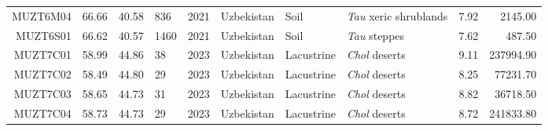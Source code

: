 \begin{table}[ht]
\begin{tabular}{rrrlrlllrr}
  MUZT6M04 & 66.66 & 40.58 & 836 & 2021 & Uzbekistan & Soil & \textit{Tau} xeric shrublands & 7.92 & 2145.00 \\ 
  MUZT6S01 & 66.62 & 40.57 & 1460 & 2021 & Uzbekistan & Soil & \textit{Tau} steppes & 7.62 & 487.50 \\ 
  MUZT7C01 & 58.99 & 44.86 & 38 & 2023 & Uzbekistan & Lacustrine & \textit{Chol} deserts & 9.11 & 237994.90 \\ 
  MUZT7C02 & 58.49 & 44.80 & 29 & 2023 & Uzbekistan & Lacustrine & \textit{Chol} deserts & 8.25 & 77231.70 \\ 
  MUZT7C03 & 58.65 & 44.73 & 31 & 2023 & Uzbekistan & Lacustrine & \textit{Chol} deserts & 8.82 & 36718.50 \\ 
  MUZT7C04 & 58.73 & 44.73 & 29 & 2023 & Uzbekistan & Lacustrine & \textit{Chol} deserts & 8.72 & 241833.80 \\ 
   \bottomrule
\end{tabular}
\end{table}
